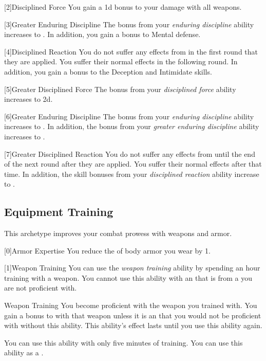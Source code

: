         [2]{Disciplined Force}
        You gain a \plus1d bonus to your damage with all weapons.

        [3]{Greater Enduring Discipline}
        The bonus from your \textit{enduring discipline} ability increases to .
        In addition, you gain a  bonus to Mental defense.

        [4]{Disciplined Reaction}
        You do not suffer any effects from  in the first round that they are applied.
        You suffer their normal effects in the following round.
        In addition, you gain a  bonus to the Deception and Intimidate skills.

        [5]{Greater Disciplined Force} The bonus from your \textit{disciplined force} ability increases to \plus2d.

        [6]{Greater Enduring Discipline}
        The bonus from your \textit{enduring discipline} ability increases to .
        In addition, the bonus from your \textit{greater enduring discipline} ability increases to .

        [7]{Greater Disciplined Reaction}
        You do not suffer any effects from  until the end of the next round after they are applied.
        You suffer their normal effects after that time.
        In addition, the skill bonuses from your \textit{disciplined reaction} ability increase to .

    \newpage
    \subsection{Equipment Training}
        This archetype improves your combat prowess with weapons and armor.

        [0]{Armor Expertise} You reduce the  of body armor you wear by 1.

        [1]{Weapon Training} You can use the \textit{weapon training} ability by spending an hour training with a weapon.
        You cannot use this ability with an  that is from a  you are not proficient with.
        \begin{freeability}{Weapon Training}
            You become proficient with the weapon you trained with.
            You gain a  bonus to  with that weapon unless it is an  that you would not be proficient with without this ability.
            This ability's effect lasts until you use this ability again.

            \rankline
             You can use this ability with only five minutes of training.
             You can use this ability as a .
        \end{freeability}

